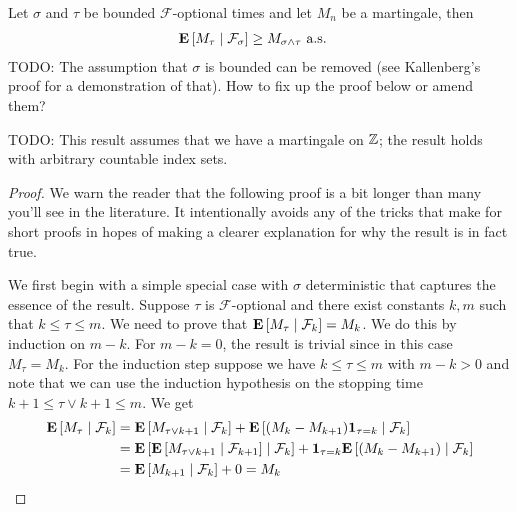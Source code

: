 \begin{thm}\label{OptionalStoppingDiscrete}Let $\sigma$ and $\tau$ be bounded
  $\mathcal{F}$-optional times and
  let $M_n$ be a martingale, then 
\begin{align*}
\cexpectationlong{\mathcal{F}_\sigma}{M_\tau} &\geq M_{\sigma \wedge
  \tau}
\text{ a.s.}
\end{align*}
TODO: The assumption that $\sigma$ is bounded can be removed (see
Kallenberg's proof for a demonstration of that).  How to fix up the
proof below or amend them?

TODO: This result assumes that we have a martingale on $\integers$;
the result holds with arbitrary countable index sets.
\end{thm}
\begin{proof}
We warn the reader that the following proof is a bit longer than many
you'll see in the literature.  It intentionally avoids any of the
tricks that make for short proofs in hopes of making a clearer
explanation for why the result is in fact true.

We first begin with a simple special case with $\sigma$ deterministic that captures the essence of
the result.  Suppose $\tau$ is $\mathcal{F}$-optional and there exist
constants $k, m$ such that $k \leq \tau \leq m$.  We need to prove
that $\cexpectationlong{\mathcal{F}_k}{M_\tau} = M_k$.  We do this by
induction on $m-k$.  For $m-k=0$, the result is trivial since in this
case $M_\tau = M_k$.  For the induction step suppose we have $k \leq
\tau \leq m$ with $m-k >0$ and note that we can use the induction
hypothesis on the stopping time $k+1 \leq \tau\vee k+1 \leq m$.  We
get
\begin{align*}
\cexpectationlong{\mathcal{F}_k}{M_\tau} &=
\cexpectationlong{\mathcal{F}_k}{M_{\tau \vee k+1}} +
\cexpectationlong{\mathcal{F}_k}{(M_k-M_{k+1})\characteristic{\tau=k}}
\\
&=\cexpectationlong{\mathcal{F}_k}{\cexpectationlong{\mathcal{F}_{k+1}}{M_{\tau
      \vee k+1}} } +
\characteristic{\tau=k}\cexpectationlong{\mathcal{F}_k}{(M_k-M_{k+1})}
\\
&=\cexpectationlong{\mathcal{F}_k}{M_{k+1}} + 0 = M_k
\end{align*}


\end{proof}
